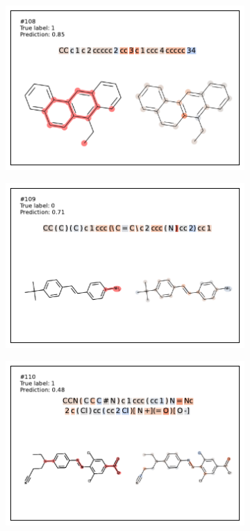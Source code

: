 \begin{figure}
\begin{subfigure}[b]{0.33\textwidth}
\end{subfigure}\begin{subfigure}[b]{0.33\textwidth} 
  \centering 
  \includegraphics[width=\textwidth]{figures/ames/ames108.pdf} 
\end{subfigure} 
\begin{subfigure}[b]{0.33\textwidth} 
  \centering 
  \includegraphics[width=\textwidth]{figures/ames/ames109.pdf} 
\end{subfigure}\begin{subfigure}[b]{0.33\textwidth} 
  \centering 
  \includegraphics[width=\textwidth]{figures/ames/ames110.pdf} 

\end{subfigure}
\end{figure}
